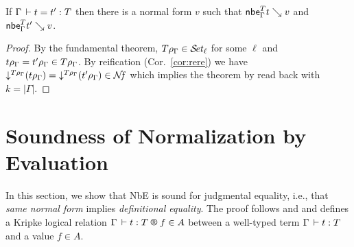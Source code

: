 \documentclass[acmlarge,review,anonymous]{acmart}\settopmatter{printfolios=true}
\newcommand{\LONGVERSION}[1]{}
\begin{document}
\begin{theorem}
  If\/ $\Gamma \der t = t' : T$ then there is a normal form $v$ such that
  $\nbe \Gamma T t \evalsto v$ and $\nbe \Gamma T {t'} \evalsto v$.
\end{theorem}
\begin{proof}
  By the fundamental theorem, $T \rho_\Gamma \in \SET[\ell]$ for some $\ell$ and
  $t \rhog = t' \rhog \in T\rhog$.  By reification (Cor.~\ref{cor:rere}) we have
  $\down{T\rhog} (t\rhog) = \down{T\rhog}(t'\rhog) \in \NF$ which implies the theorem
  by read back with $k = |\Gamma|$.
\end{proof}



\section{Soundness  of Normalization by Evaluation}
\label{sec:soundnbe}

In this section, we show that NbE is sound for judgmental equality,
i.e., that \emph{same normal form} implies \emph{definitional equality}.  The proof
follows \citet{abelCoquandDybjer:lics07} and
\citet{fridlenderPagano:tlca13} and defines a Kripke logical relation
$\LR \Gamma t T f A$ between a well-typed term $\Gamma \der t : T$ and
a value $f \in A$.
\LONGVERSION{
However, in contrast to the cited works,
the logical relation defined in the following will also yield a weak
head normalization theorem.
} %
\end{document}

